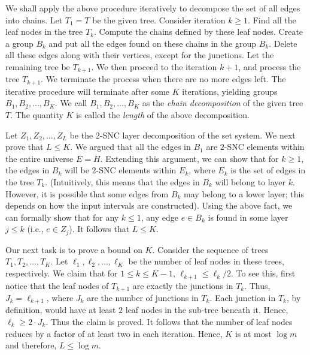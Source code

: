 \documentclass[11pt]{article}
\begin{document}
We shall apply the above procedure iteratively to decompose the set of all edges into chains.
Let $T_1=T$ be the given tree. Consider iteration $k\geq 1$.
Find all the leaf nodes in the tree $T_k$. Compute the chains defined by these leaf nodes.
Create a group $B_k$ and put all the edges found on these chains in the group $B_k$.
Delete all these edges along with their vertices, except for the junctions.
Let the remaining tree be $T_{k+1}$. We then proceed to the iteration $k+1$,
and process the tree $T_{k+1}$. We terminate the process when there are no more edges left.
The iterative procedure will terminate after some $K$ iterations,
yielding groups $B_1, B_2, \ldots, B_K$. We call $B_1, B_2, \ldots, B_K$
as the {\em chain decomposition} of the given tree $T$. The quantity $K$ is called the
{\em length} of the above decomposition. 

Let $Z_1, Z_2, \ldots, Z_L$ be the $2$-SNC layer decomposition of the set system.
We next prove that $L\leq K$. We argued that all the edges in $B_1$ are $2$-SNC elements 
within the entire universe $E=H$.
Extending this argument, we can show that for $k\geq 1$, the edges in $B_k$ will be $2$-SNC elements within $E_k$,
where $E_k$ is the set of edges in the tree $T_k$.
(Intuitively, this means that the edges in $B_k$ will belong to layer $k$. 
However, it is possible that some edges from $B_k$ may belong to a lower layer;
this depends on how the input intervals are constructed). 
Using the above fact, we can formally show that for any $k\leq 1$,
any edge $e\in B_k$ is found in some layer $j\leq k$ (i.e., $e\in Z_j$).
It follows that $L\leq K$.

Our next task is to prove a bound on $K$.
Consider the sequence of trees $T_1, T_2, \ldots, T_K$.
Let $\ell_1, \ell_2, \ldots, \ell_K$ be the number of leaf nodes in these trees, respectively.
We claim that for $1\leq k \leq K-1$, $\ell_{k+1}\leq \ell_k/2$.
To see this, first notice that the leaf nodes of $T_{k+1}$ are exactly the junctions in $T_k$.
Thus, $J_k = \ell_{k+1}$, where $J_k$ are the number of junctions in $T_k$.
Each junction in $T_k$, by definition, would have at least $2$ leaf nodes in the sub-tree beneath it.
Hence, $\ell_k \geq 2\cdot J_k$. Thus the claim is proved. It follows that the number of leaf nodes
reduces by a factor of at least two in each iteration. Hence, $K$ is at most $\log m$
and therefore, $L\leq \log m$.
\end{document}
